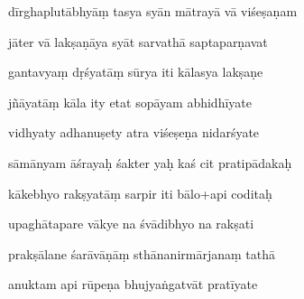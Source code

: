 \documentclass[article,12pt,a4paper]{memoir}%
\newcounter{parCount}
\begin{document}
	  
	  \pstart {} dīrghaplutābhyāṃ tasya syān mātrayā vā viśeṣaṇam 
	{}
	\pend%
      

	  
	  \pstart \leavevmode%
	jāter vā lakṣaṇāya syāt sarvathā saptaparṇavat 
	{}
	\pend%
      

	  
	  \pstart {} gantavyaṃ dṛśyatāṃ sūrya iti kālasya lakṣaṇe 
	{}
	\pend%
      

	  
	  \pstart \leavevmode%
	jñāyatāṃ kāla ity etat sopāyam abhidhīyate 
	{}
	\pend%
      

	  
	  \pstart {} vidhyaty adhanuṣety atra viśeṣeṇa nidarśyate 
	{}
	\pend%
      

	  
	  \pstart \leavevmode%
	sāmānyam āśrayaḥ śakter yaḥ kaś cit pratipādakaḥ 
	{}
	\pend%
      

	  
	  \pstart {} kākebhyo rakṣyatāṃ sarpir iti bālo+api coditaḥ 
	{}
	\pend%
      

	  
	  \pstart \leavevmode%
	upaghātapare vākye na śvādibhyo na rakṣati 
	{}
	\pend%
      

	  
	  \pstart {} prakṣālane śarāvāṇāṃ sthānanirmārjanaṃ tathā 
	{}
	\pend%
      

	  
	  \pstart \leavevmode%
	anuktam api rūpeṇa bhujyaṅgatvāt pratīyate 
	{}
	\pend%
      
\end{document}

